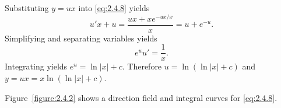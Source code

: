 \documentclass{ximera}
\begin{document}
Substituting  $y=ux$
into \eqref{eq:2.4.8} yields
$$
u'x+u =  \frac{ux+xe^{-ux/x}}{x} = u+e^{-u}.
$$
 Simplifying and separating variables yields
$$
e^uu'=\frac{1}{x}.
$$
Integrating yields
$e^u=\ln |x|+c$.
Therefore
$u=\ln(\ln|x|+c)$ and
$y=ux=x \ln (\ln |x|+c)$.

Figure~\ref{figure:2.4.2} shows
a direction field and integral curves for \eqref{eq:2.4.8}.

\begin{center}
\end{center}
\end{document}
